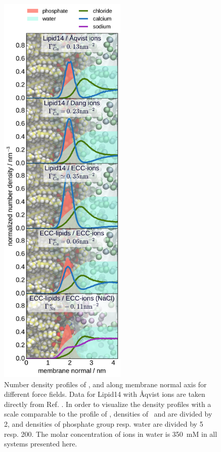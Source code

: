 \documentclass[aip,jcp,twocolumn]{revtex4}
\begin{document}
\begin{figure}[htbp!]
  \centering
  \includegraphics[height=19.5cm]{../Fig/ipython_nb/density_profiles_ca_cl_wat_phos_models-compar.pdf}
  \caption{\label{fig:cacl-dens}
    Number density profiles of ,  and  along membrane normal axis
    for different force fields. Data for Lipid14 with \AA{}qvist ions are taken directly from Ref. .
    In order to visualize the density profiles with a scale comparable to the profile of , 
    densities of~ and  are divided by 2, and
    densities of phosphate group resp. water are divided by 5 resp. 200. 
    The molar concentration of ions in water is 350~mM in all systems
    presented here. 
    }
\end{figure}
\end{document}
